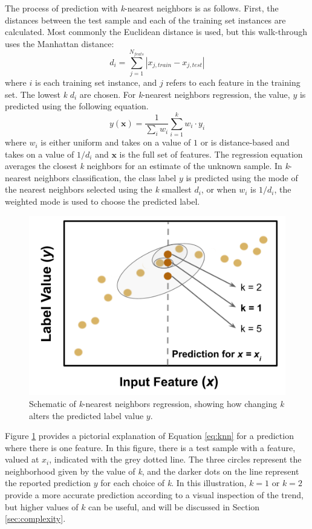The process of prediction with \textit{k}-nearest neighbors is as follows.
First, the distances between the test sample and each of the training set
instances are calculated.  Most commonly the Euclidean distance is used, but
this walk-through uses the Manhattan distance:
\begin{equation}
  d_{i} = \sum_{j=1}^{N_{feats}} |x_{j,train} - x_{j,test}|
  \label{eq:l1}
\end{equation}
where $i$ is each training set instance, and $j$ refers to each feature in the
training set.  The lowest \textit{k} $d_{i}$ are chosen. For \textit{k}-nearest
neighbors regression, the value, $y$ is predicted using the following equation.
\begin{equation}
  y(\boldsymbol{x}) = \frac{1}{\sum_{i}{w_i}} \sum_{i=1}^{k} w_i \cdot y_i
  \label{eq:knn}
\end{equation}
where $w_{i}$ is either uniform and takes on a value of $1$ or is
distance-based and takes on a value of $1/d_{i}$ and $\boldsymbol{x}$ is the
full set of features. The regression equation averages the closest \textit{k}
neighbors for an estimate of the unknown sample.  In \textit{k}-nearest
neighbors classification, the class label $y$ is predicted using the mode of
the nearest neighbors selected using the \textit{k} smallest $d_i$, or when
$w_i$ is $1/d_i$, the weighted mode is used to choose the predicted label.

\begin{figure}[!htb]
  \centering
  \includegraphics[width=0.8\linewidth]{./chapters/litrev/nn-fig.png}
  \caption{Schematic of \textit{k}-nearest neighbors regression, showing how 
           changing \textit{k} alters the predicted label value $y$.}
  \label{fig:nn}
\end{figure}

Figure \ref{fig:nn} provides a pictorial explanation of Equation \ref{eq:knn}
for a prediction where there is one feature. In this figure, there is a test
sample with a feature, valued at $x_i$, indicated with the grey dotted line.
The three circles represent the neighborhood given by the value of \textit{k},
and the darker dots on the line represent the reported prediction $y$ for each
choice of \textit{k}.  In this illustration, $k=1$ or $k=2$ provide a more
accurate prediction according to a visual inspection of the trend, but higher
values of $k$ can be useful, and will be discussed in Section
\ref{sec:complexity}.


